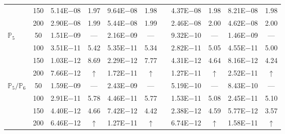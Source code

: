 \begin{table}[H]
{\begin{tabular}{@{}l c c c c c c c c c c@{}}
 & 150 & 5.14E$-$08 & 1.97  & 9.64E$-$08 & 1.98 &  & 4.37E$-$08 & 1.98 & 8.21E$-$08 & 1.98\\
 & 200 & 2.90E$-$08 & 1.99  & 5.44E$-$08 & 1.99 &  & 2.46E$-$08 & 2.00 & 4.62E$-$08 & 2.00\\
\midrule
\multirow{4}{*}{$\mathbb{P}_{5}$}
 & 50 & 1.51E$-$09 & ---  & 2.16E$-$09 & --- &  & 9.32E$-$10 & --- & 1.46E$-$09 & ---\\
 & 100 & 3.51E$-$11 & 5.42  & 5.35E$-$11 & 5.34 &  & 2.82E$-$11 & 5.05 & 4.55E$-$11 & 5.00\\
 & 150 & 1.03E$-$12 & 8.69  & 2.29E$-$12 & 7.77 &  & 4.31E$-$12 & 4.64 & 8.16E$-$12 & 4.24\\
 & 200 & 7.66E$-$12 & $\uparrow$  & 1.72E$-$11 & $\uparrow$ &  & 1.27E$-$11 & $\uparrow$ & 2.52E$-$11 & $\uparrow$\\
\midrule
\multirow{4}{*}{$\mathbb{P}_{5}/\mathbb{P}_{6}$}
 & 50 & 1.59E$-$09 & ---  & 2.43E$-$09 & --- &  & 5.19E$-$10 & --- & 8.43E$-$10 & ---\\
 & 100 & 2.91E$-$11 & 5.78  & 4.46E$-$11 & 5.77 &  & 1.53E$-$11 & 5.08 & 2.45E$-$11 & 5.10\\
 & 150 & 4.40E$-$12 & 4.66  & 7.42E$-$12 & 4.42 &  & 2.38E$-$12 & 4.59 & 5.77E$-$12 & 3.57\\
 & 200 & 6.46E$-$12 & $\uparrow$  & 1.27E$-$11 & $\uparrow$ &  & 6.74E$-$12 & $\uparrow$ & 1.58E$-$11 & $\uparrow$\\
\bottomrule
\end{tabular}}
\label{none}
\end{table}

